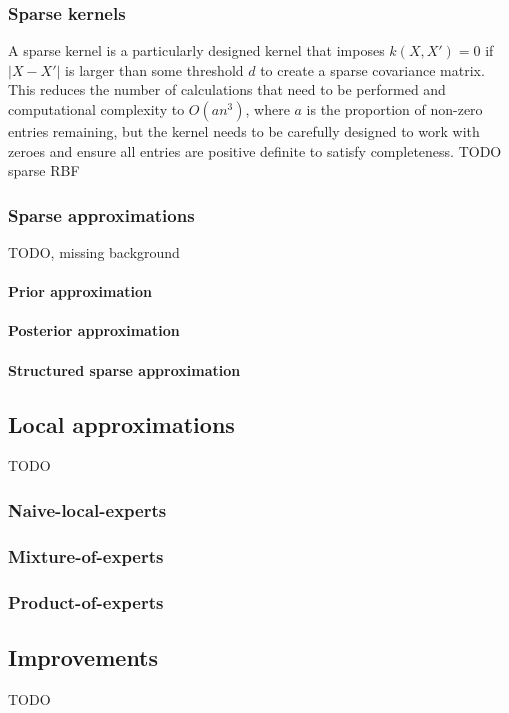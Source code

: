 \subsubsection{Sparse kernels}
A sparse kernel is a particularly designed kernel that imposes $k(X,X') = 0$ if $|X - X'|$ is larger than some threshold $d$ to create a sparse covariance matrix. This reduces the number of calculations that need to be performed and computational complexity to $O(an^3)$, where $a$ is the proportion of non-zero entries remaining, but the kernel needs to be carefully designed to work with zeroes and ensure all entries are positive definite to satisfy completeness. TODO sparse RBF

\subsubsection{Sparse approximations}
TODO, missing background

\paragraph{Prior approximation}
\paragraph{Posterior approximation}
\paragraph{Structured sparse approximation}


\subsection{Local approximations}
TODO

\subsubsection{Naive-local-experts}

\subsubsection{Mixture-of-experts}

\subsubsection{Product-of-experts}


\subsection{Improvements}
TODO


